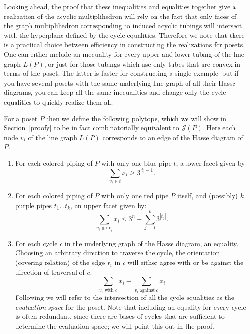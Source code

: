 \documentclass{article}
\begin{document}
Looking ahead, the proof that these inequalities and equalities together give a realization of the acyclic multiplihedron will rely on the fact that only faces of the graph multiplihedron corresponding to induced acyclic tubings will intersect with the hyperplane defined by the cycle equalities. Therefore we note that there is a practical choice between efficiency in constructing the realizations for posets. One
can either include an inequality for every upper and lower tubing of the line graph $L(P)$, or just for those tubings
which use only tubes that are convex in terms of the poset. The latter is faster for constructing a single
example, but if you have several posets with the same underlying line graph of all their Hasse diagrams, you
can keep all the same inequalities and change only the cycle equalities to quickly realize them all.
\begin{defn}\label{really}
    For a poset $P$ then we define the following polytope, which we will show in Section~\ref{proofy} to be in fact combinatorially equivalent to $\mathcal{J}(P)$. Here each node $v_i$ of the line graph $L(P)$ corresponds to an edge of the Hasse diagram of $P.$
\end{defn}
\begin{enumerate}
    \item For each colored piping of $P$ with only one blue pipe $t$, a lower facet given by $$\sum_{v_i\in t} x_i \ge 3^{|t|-1} .$$
    \item For each colored piping of $P$ with only one red pipe $P$ itself, and (possibly) $k$ purple pipes $t_1\dots t_k$, an upper facet given by: $$\sum_{v_i\notin \cup t_j}x_i \le 3^n-\sum_{j=1}^k3^{|t_j|}.$$
    \item For each cycle $c$ in the underlying graph of the Hasse diagram, an equality. Choosing an arbitrary direction to traverse the cycle, the orientation (covering relation) of the edge $v_i$ in $c$ will either agree with or be against the direction of traversal of $c$.
    $$\sum_{v_i \text{ with }c }x_i = \sum_{v_i \text{ against } c}x_i $$ Following \cite{mppfull} we will refer to the intersection of all the cycle equalities as the \textit{evaluation space} for the poset. Note that including an equality for every cycle is often redundant, since there are bases of cycles that are sufficient to determine the evaluation space; we will point this out in the proof.
\end{enumerate}
\end{document}
